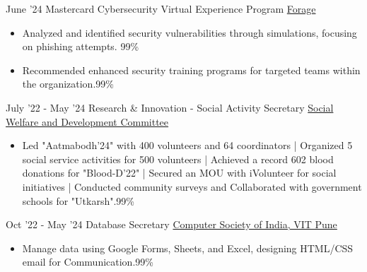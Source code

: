 \documentclass[9pt]{developercv} %
\begin{document}
\vspace{-24 pt}
\vspace{-2 pt}
\begin{entrylist}
    \entry
		{June '24}
		{Mastercard Cybersecurity Virtual Experience Program}
            {\href{https://forage-uploads-prod.s3.amazonaws.com/completion-certificates/mastercard/vcKAB5yYAgvemepGQ_Mastercard_N83YbH5ngw9aE8TKL_1717572444760_completion_certificate.pdf}{\normalsize Forage}}
		{\vspace{-10pt}
        \begin{itemize}[noitemsep,topsep=0pt,parsep=0pt,partopsep=0pt, leftmargin=-1pt]
            \item { Analyzed and identified security vulnerabilities through simulations, focusing on phishing attempts. {\color{white}99\%}}
            \item { Recommended enhanced security training programs for targeted teams within the organization.{\color{white}99\%}}
        \end{itemize} }
	\entry
            {July '22 - May '24}
		{Research \& Innovation - Social Activity Secretary}
            {\href{https://www.linkedin.com/company/vit-social-welfare-development/mycompany/}{\normalsize Social Welfare and Development Committee}}
		{\vspace{-10pt}
        \begin{itemize}[noitemsep,topsep=0pt,parsep=0pt,partopsep=0pt, leftmargin=-1pt]
            \item {Led "Aatmabodh’24" with 400 volunteers and 64 coordinators | Organized 5 social service activities for 500 volunteers | Achieved a record 602 blood donations for "Blood-D’22" | Secured an MOU with iVolunteer for social initiatives |  Conducted community surveys and Collaborated with government schools for "Utkarsh".{\color{white}99\%}}
        \end{itemize}}
        \vspace{-2 pt}
	\entry
		{Oct '22 - May '24}
		{Database Secretary}
            {\href{https://www.linkedin.com/company/computer-society-of-india-vit-pune/}{\normalsize Computer Society of India, VIT Pune}}
		{\vspace{-10pt}
        \begin{itemize}[noitemsep,topsep=0pt,parsep=0pt,partopsep=0pt, leftmargin=-1pt]
            \item {Manage data using Google Forms, Sheets, and Excel, designing HTML/CSS email for Communication.{\color{white}99\%}}
        \end{itemize} }
\end{entrylist}
\end{document}
